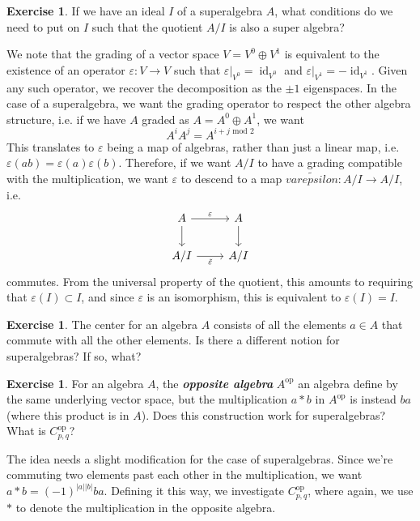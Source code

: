 \documentclass[psamsfonts]{amsart}
\theoremstyle{definition}
\newtheorem{exer}[thm]{Exercise}
\theoremstyle{remark}
\newcommand{\ib}[1]{\textbf{\textit{#1}}}
\DeclareMathOperator{\id}{id}
\begin{document}
%
\begin{exer}
If we have an ideal $I$ of a superalgebra $A$, what conditions do we need to put on $I$ such that the quotient $A/I$ is also a super algebra?
\end{exer}
We note that the grading of a vector space $V = V^0 \oplus V^1$ is equivalent to the existence of an operator $\varepsilon : V \to V$ such that $\varepsilon\vert_{V^0} = \id_{V^0}$ and $\varepsilon\vert_{V^1} = -\id_{V^1}$. Given any such operator, we recover the decomposition as the $\pm 1$ eigenspaces. In the case of a superalgebra, we want the grading operator to respect the other algebra structure, i.e. if we have $A$ graded as $A = A^0 \oplus A^1$, we want
$$A^iA^j = A^{i + j \text{ mod } 2} $$
This translates to $\varepsilon$ being a map of algebras, rather than just a linear map, i.e. $\varepsilon(ab) = \varepsilon(a)\varepsilon(b)$. Therefore, if we want $A/I$ to have a grading compatible with the multiplication, we want $\varepsilon$ to descend to a map $\tilde{varepsilon} : A/I \to A/I$, i.e.
$$\begin{tikzcd} 
A \ar[d] \ar[r, "\varepsilon"] & A \ar[d] \\
A /I \ar[r, "\tilde{\varepsilon}"'] & A/I
\end{tikzcd}$$
commutes. From the universal property of the quotient, this amounts to requiring that $\varepsilon(I) \subset I$, and since $\varepsilon$ is an isomorphism, this is equivalent to $\varepsilon(I) = I$.
%
\begin{exer}
The center for an algebra $A$ consists of all the elements $a \in A$ that commute with all the other elements. Is there a different notion for superalgebras? If so, what?
\end{exer}
%
\begin{exer}
For an algebra $A$, the \ib{opposite algebra} $A^\text{op}$ an algebra define by the same underlying vector space, but the multiplication $a*b$ in $A^\text{op}$ is instead $ba$ (where this product is in $A$). Does this construction work for superalgebras? What is $C_{p,q}^\text{op}$?
\end{exer}
The idea needs a slight modification for the case of superalgebras. Since we're commuting two elements past each other in the multiplication, we want $a*b = (-1)^{|a||b|}ba$. Defining it this way, we investigate $C_{p,q}^\text{op}$, where again, we use $*$ to denote the multiplication in the opposite algebra.
\end{document}
